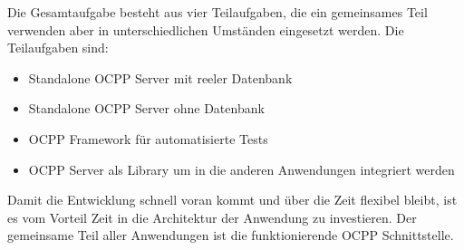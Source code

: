 Die Gesamtaufgabe besteht aus vier Teilaufgaben, die ein gemeinsames Teil verwenden aber in unterschiedlichen Umständen eingesetzt werden.
Die Teilaufgaben sind:

\begin{itemize}
    \item Standalone OCPP Server mit reeler Datenbank
    \item Standalone OCPP Server ohne Datenbank
    \item OCPP Framework für automatisierte Tests
    \item OCPP Server als Library um in die anderen Anwendungen integriert werden
\end{itemize}

Damit die Entwicklung schnell voran kommt und über die Zeit flexibel bleibt, ist es vom Vorteil Zeit in die Architektur der Anwendung 
zu investieren. Der gemeinsame Teil aller Anwendungen ist die funktionierende OCPP Schnittstelle. 